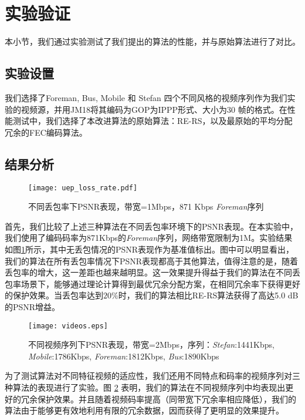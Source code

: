 \section{实验验证}
本小节，我们通过实验测试了我们提出的算法的性能，并与原始算法进行了对比。

    \subsection{实验设置}
    我们选择了Foreman, Bus, Mobile 和 Stefan 四个不同风格的视频序列作为我们实验的视频源，并用JM18\cite{website:jm18}将其编码为GOP为IPPP形式、大小为30 帧的格式。在性能测试中，我们选择了本改进算法的原始算法：RE-RS\cite{xiao2013real}，以及最原始的平均分配冗余的FEC编码算法。


    \subsection{结果分析}

\begin{figure}[htbp]
  \centering
  \texttt{[image: uep\_loss\_rate.pdf]}\\
  \caption{不同丢包率下PSNR表现，带宽=1Mbps，871 Kbps \emph{Foreman}序列}\label{fig:lossrate}
\end{figure}

首先，我们比较了上述三种算法在不同丢包率环境下的PSNR表现。在本实验中，我们使用了编码码率为871Kbps的\emph{Foreman}序列，网络带宽限制为1M。实验结果如图\ref{fig:lossrate}所示，其中无丢包情况的PSNR表现作为基准值标出。图中可以明显看出，我们的算法在所有丢包率情况下PSNR表现都高于其他算法，值得注意的是，随着丢包率的增大，这一差距也越来越明显。这一效果提升得益于我们的算法在不同丢包率场景下，能够通过理论计算得到最优冗余分配方案，在相同冗余率下获得更好的保护效果。当丢包率达到$20\%$时，我们的算法相比RE-RS算法获得了高达5.0 dB的PSNR增益。

\begin{figure}[htbp]
  \centering
  \texttt{[image: videos.eps]}\\
  \caption{不同视频序列下PSNR表现，带宽=2Mbps，序列：\emph{Stefan}:1441Kbps, \emph{Mobile}:1786Kbps, \emph{Foreman}:1812Kbps, \emph{Bus}:1890Kbps}\label{fig:videos}
\end{figure}

为了测试算法对不同特征视频的适应性，我们还用不同特点和码率的视频序列对三种算法的表现进行了实验。图 \ref{fig:videos} 表明，我们的算法在不同视频序列中均表现出更好的冗余保护效果。并且随着视频码率提高（同带宽下冗余率相应降低），我们的算法由于能够更有效地利用有限的冗余数据，因而获得了更明显的效果提升。

